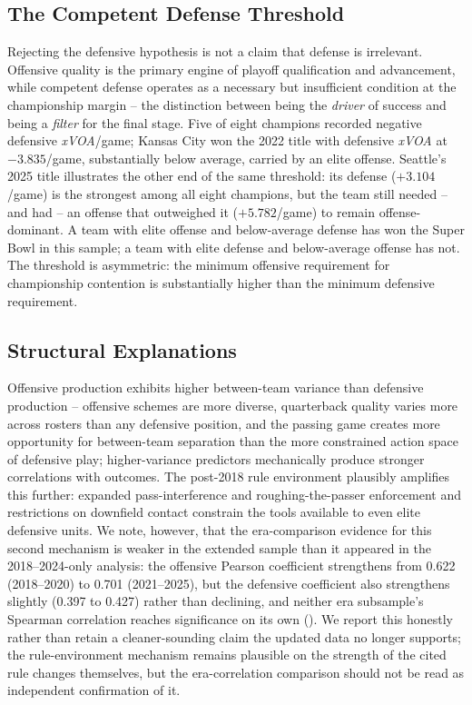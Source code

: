 \documentclass[12pt,a4paper]{article}
\newcommand{\xvoa}{\textit{xVOA}}
\begin{document}
\subsection{The Competent Defense Threshold}
\label{sec:threshold}

Rejecting the defensive hypothesis is not a claim that defense is irrelevant. Offensive quality is the primary engine of playoff qualification and advancement, while competent defense operates as a necessary but insufficient condition at the championship margin -- the distinction between being the \emph{driver} of success and being a \emph{filter} for the final stage. Five of eight champions recorded negative defensive \xvoa{}/game; Kansas City won the 2022 title with defensive \xvoa{} at $-3.835$/game, substantially below average, carried by an elite offense. Seattle's 2025 title illustrates the other end of the same threshold: its defense ($+3.104$/game) is the strongest among all eight champions, but the team still needed -- and had -- an offense that outweighed it ($+5.782$/game) to remain offense-dominant. A team with elite offense and below-average defense has won the Super Bowl in this sample; a team with elite defense and below-average offense has not. The threshold is asymmetric: the minimum offensive requirement for championship contention is substantially higher than the minimum defensive requirement.

\subsection{Structural Explanations}
\label{sec:structural}

Offensive production exhibits higher between-team variance than defensive production -- offensive schemes are more diverse, quarterback quality varies more across rosters than any defensive position, and the passing game creates more opportunity for between-team separation than the more constrained action space of defensive play; higher-variance predictors mechanically produce stronger correlations with outcomes. The post-2018 rule environment plausibly amplifies this further: expanded pass-interference and roughing-the-passer enforcement and restrictions on downfield contact \citep{pereira2018roughing, barnwell2019passingrevolution} constrain the tools available to even elite defensive units. We note, however, that the era-comparison evidence for this second mechanism is weaker in the extended sample than it appeared in the 2018--2024-only analysis: the offensive Pearson coefficient strengthens from 0.622 (2018--2020) to 0.701 (2021--2025), but the defensive coefficient also strengthens slightly (0.397 to 0.427) rather than declining, and neither era subsample's Spearman correlation reaches significance on its own (). We report this honestly rather than retain a cleaner-sounding claim the updated data no longer supports; the rule-environment mechanism remains plausible on the strength of the cited rule changes themselves, but the era-correlation comparison should not be read as independent confirmation of it.
\end{document}
